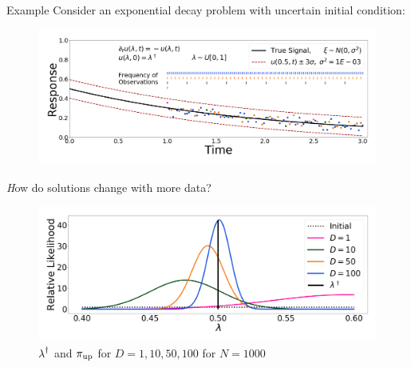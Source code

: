 \begin{block}{Example}
\centering
    Consider an exponential decay problem with uncertain initial condition:
\vspace{-0.5cm}
    \begin{figure}
        \includegraphics[width=26cm]{exponential_decay_response_sigma-10E-4}
    \end{figure}


\vspace{1cm}

\centering
{}
{\emph How do solutions change with more data?}
\vspace{-0.5cm}
    \begin{figure}
        \includegraphics[width=26cm]{updated_convergence_sigma-10E-4}
        \vspace{-0.5cm}
        \caption{ $\operatorname*{\lambda}^\dagger$ and $\operatorname*{\pi_{up}}$ for $D=1, 10, 50, 100$ for $N=1000$}
    \end{figure}


\vspace{1cm}


\end{block}
